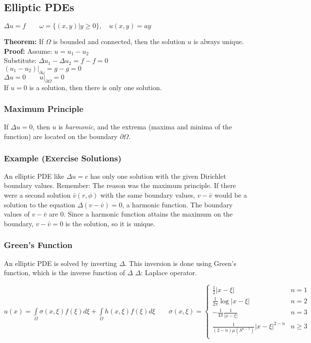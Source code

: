 
\subsection{Elliptic PDEs}
$\Delta u=f\qquad \omega=\{(x,y)|y\geq 0\},\quad u(x,y)=ay$

\textbf{Theorem:} If $\Omega$ is bounded and connected, then the solution $u$ is always unique.\\

\textbf{Proof:} Assume: $u=u_1-u_2$\\
Substitute: $\Delta u_1 - \Delta u_2=f-f=0$\\
$\left.(u_1-u_2)\right|_{\partial \omega}=g-g=0$\\
$\Delta u=0 \qquad \left.u\right|_{\partial\Omega}=0$\\
If $u=0$ is a solution, then there is only one solution.

\subsubsection{Maximum Principle}

If $\Delta u=0$, then $u$ is \emph{harmonic}, and the extrema (maxima and minima of the function) are located on the boundary $\partial\Omega$.

\subsubsection{Example (Exercise Solutions)}
An elliptic PDE like $\Delta u = c$ has only one solution with the given Dirichlet boundary values. Remember: The reason was the maximum principle. If there were a second solution $\bar v(r,\phi)$ with the same boundary values, $v - \bar v$ would be a solution to the equation $\Delta (v - \bar v) = 0$, a harmonic function. The boundary values of $v - \bar v$ are 0. Since a harmonic function attains the maximum on the boundary, $v - \bar v = 0$ is the solution, so it is unique.

\newpage
\subsubsection{Green's Function}

An elliptic PDE is solved by inverting $\Delta$. This inversion is done using Green's function, which is the inverse function of $\Delta$ \qquad $\Delta$: Laplace operator.

$u(x)=\int\limits_\Omega{\sigma(x,\xi)f(\xi)d\xi}+\int\limits_\Omega{h(x,\xi)f(\xi)d\xi}\qquad \sigma(x,\xi)=
\begin{cases}
	\frac 12|x-\xi| & n=1\\
	\frac 1{2\pi}\log|x-\xi| & n=2\\
	-\frac 1{4\pi}\frac{1}{|x-\xi|} & n=3\\
	\frac {1}{(2-n)\mu(S^{n-1})}|x-\xi|^{2-n} & n\geq 3\\
\end{cases}$\\


